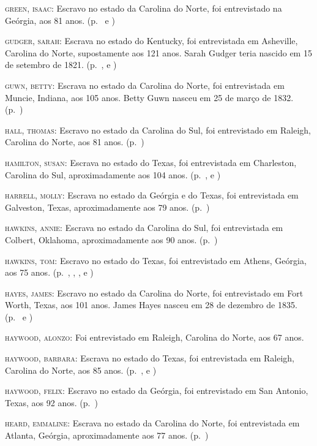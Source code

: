 \begin{Parskip}
\textsc{green, isaac:} Escravo no estado da Carolina do Norte, foi
entrevistado na Geórgia, aos 81 anos. (p.~\pageref{ref112} e \pageref{ref113})

\textsc{gudger, sarah:} Escrava no estado do Kentucky, foi entrevistada
em Asheville, Carolina do Norte, supostamente aos 121 anos. Sarah Gudger
teria nascido em 15 de setembro de 1821. (p.~\pageref{ref114}, \pageref{ref115} e \pageref{ref116})

\textsc{guwn, betty:} Escrava no estado da Carolina do Norte, foi
entrevistada em Muncie, Indiana, aos 105 anos. Betty Guwn nasceu em 25
de março de 1832. (p.~\pageref{ref117})

\textsc{hall, thomas:} Escravo no estado da Carolina do Sul, foi
entrevistado em Raleigh, Carolina do Norte, aos 81 anos. (p.~\pageref{ref118})

\textsc{hamilton, susan:} Escrava no estado do Texas, foi entrevistada
em Charleston, Carolina do Sul, aproximadamente aos 104 anos. (p.~\pageref{ref119}, \pageref{ref120} e \pageref{ref121})

\textsc{harrell, molly:} Escrava no estado da Geórgia e do Texas, foi
entrevistada em Galveston, Texas, aproximadamente aos 79 anos. (p.~\pageref{ref122})

\textsc{hawkins, annie:} Escrava no estado da Carolina do Sul, foi
entrevistada em Colbert, Oklahoma, aproximadamente aos 90 anos. (p.~\pageref{ref123})

\textsc{hawkins, tom:} Escravo no estado do Texas, foi entrevistado em
Athens, Geórgia, aos 75 anos. (p.~\pageref{ref124}, \pageref{ref125}, \pageref{ref126}, \pageref{ref127} e \pageref{ref128})

\textsc{hayes, james:} Escravo no estado da Carolina do Norte, foi
entrevistado em Fort Worth, Texas, aos 101 anos. James Hayes nasceu em
28 de dezembro de 1835. (p.~\pageref{ref129} e \pageref{ref130})

\textsc{haywood, alonzo:} Foi entrevistado em Raleigh, Carolina do
Norte, aos 67 anos. %

\textsc{haywood, barbara:} Escrava no estado do Texas, foi entrevistada
em Raleigh, Carolina do Norte, aos 85 anos. (p.~\pageref{ref131}, \pageref{ref132} e \pageref{ref133})

\textsc{haywood, felix:} Escravo no estado da Geórgia, foi entrevistado
em San Antonio, Texas, aos 92 anos. (p.~\pageref{ref134})

\textsc{heard, emmaline:} Escrava no estado da Carolina do Norte, foi
entrevistada em Atlanta, Geórgia, aproximadamente aos 77 anos. (p.~\pageref{ref135})


\end{Parskip}
